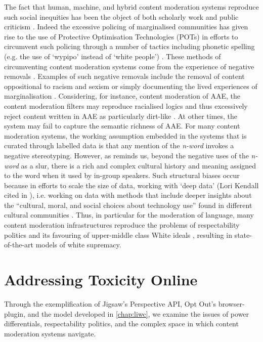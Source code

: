The fact that human, machine, and hybrid content moderation systems reproduce such social inequities has been the object of both scholarly work \cite{Davidson:2019,Sap:2019,Dixon:2018,Gomes:2018} and public criticism \cite{Guynn:2019}. Indeed the excessive policing of marginalised communities has given rise to the use of Protective Optimisation Technologies (POTs) \cite{Kulynych:2020} in efforts to circumvent such policing through a number of tactics including phonetic spelling (e.g. the use of `wypipo' instead of `white people') \cite{Guynn:2019}. These methods of circumventing content moderation systems come from the experience of negative removals \cite{Guynn:2019}. Examples of such negative removals include the removal of content oppositional to racism and sexism or simply documenting the lived experiences of marginalisation \citep{Kirtz:2021}. Considering, for instance, content moderation of AAE, the content moderation filters may reproduce racialised logics and thus excessively reject content written in AAE as particularly dirt-like \cite{Waseem:2018}. At other times, the system may fail to capture the semantic richness of AAE. For many content moderation systems, the working assumption embedded in the systems  \cite{Davidson:2019} that is curated through labelled data \cite{Waseem:2018} is that any mention of the \textit{n-word} invokes a negative stereotyping. However, as \citet{Rahman:2012} reminds us, beyond the negative uses of the \textit{n-word} as a slur, there is a rich and complex cultural history and meaning assigned to the word when it used by in-group speakers. Such structural biases occur because in efforts to scale the size of data, working with `deep data' (Lori Kendall cited in \citet{Brock:2015}), i.e. working on data with methods that include deeper insights about the ``cultural, moral, and social choices about technology use'' found in different cultural communities \cite{Brock:2015}.
Thus, in particular for the moderation of language, many content moderation infrastructures reproduce the problems of respectability politics and its favouring of upper-middle class White ideals \cite{Kerrison:2017}, resulting in state-of-the-art models of white supremacy.

\section{Addressing Toxicity Online}

Through the exemplification of Jigsaw's Perspective API, Opt Out's browser-plugin, and the model developed in \autoref{chap:liwc}, we examine the issues of power differentials, respectability politics, and the complex space in which content moderation systems navigate.

